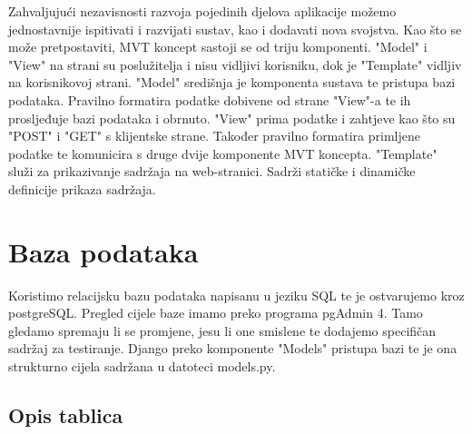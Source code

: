 		Zahvaljujući nezavisnosti razvoja pojedinih djelova aplikacije možemo jednostavnije ispitivati i razvijati sustav, kao i dodavati nova svojstva. Kao što se može pretpostaviti, MVT koncept sastoji se od triju komponenti. "Model" i "View" na strani su poslužitelja i nisu vidljivi korisniku, dok je "Template" vidljiv na korisnikovoj strani. "Model" središnja je komponenta sustava te pristupa bazi podataka. Pravilno formatira podatke dobivene od strane "View"-a te ih prosljeđuje bazi podataka i obrnuto. "View" prima podatke i zahtjeve kao što su "POST" i "GET" s klijentske strane. Također pravilno formatira primljene podatke te komunicira s druge dvije komponente MVT koncepta. "Template" služi za prikazivanje sadržaja na web-stranici. Sadrži statičke i dinamičke definicije prikaza sadržaja.
		
	
		
		

				
		\section{Baza podataka}
			
		Koristimo relacijsku bazu podataka napisanu u jeziku SQL te je ostvarujemo kroz postgreSQL. Pregled cijele baze imamo preko programa pgAdmin 4. Tamo gledamo spremaju li se promjene, jesu li one smislene te dodajemo specifičan sadržaj za testiranje. Django preko komponente "Models" pristupa bazi te je ona strukturno cijela sadržana u datoteci models.py.
		
			\subsection{Opis tablica}
			
